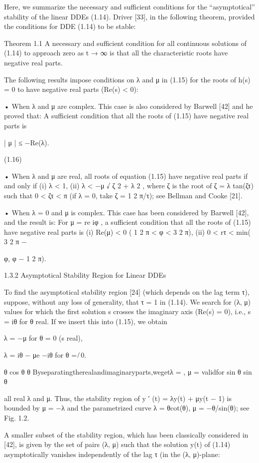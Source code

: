 \documentclass[12pt]{article}
\begin{document}
Here, we summarize the necessary and sufficient conditions for the “asymptotical” stability of the linear DDEs (1.14). Driver [33], in the 
following theorem, provided the conditions for DDE (1.14) to be stable:

Theorem 1.1 A necessary and sufficient condition for all continuous solutions of (1.14) to approach zero as t → ∞ is that all the 
characteristic roots have negative real parts.

The following results impose conditions on λ and μ in (1.15) for the roots of h(s) = 0 to have negative real parts (Re(s) < 0):

• When λ and μ are complex. This case is also considered by Barwell [42] and he proved that: A sufficient condition that all the roots of 
(1.15) have negative real parts is

| μ | ≤ −Re(λ).

(1.16)

• When λ and μ are real, all roots of equation (1.15) have negative real parts if and only if (i) λ < 1, (ii) λ < −μ √ ζ 2 + λ 2 , where ζ 
is the root of ζ = λ tan(ζτ) such that 0 < ζτ < π (if λ = 0, take ζ = 1 2 π/τ); see Bellman and Cooke [21].

• When λ = 0 and μ is complex. This case has been considered by Barwell [42], and the result is: For μ = re iφ , a sufficient condition that 
all the roots of (1.15) have negative real parts is (i) Re(μ) < 0 ( 1 2 π < φ < 3 2 π), (ii) 0 < rτ < min( 3 2 π −

φ, φ − 1 2 π).

1.3.2 Asymptotical Stability Region for Linear DDEs

To find the asymptotical stability region [24] (which depends on the lag term τ), suppose, without any loss of generality, that τ = 1 in 
(1.14). We search for (λ, μ) values for which the first solution s crosses the imaginary axis (Re(s) = 0), i.e., s = iθ for θ real. If we 
insert this into (1.15), we obtain

λ = −μ for θ = 0 (s real),

λ = iθ − μe −iθ for θ = ̸ 0.

θ cos θ θ Byseparatingtherealandimaginaryparts,wegetλ = , μ = validfor sin θ sin θ

all real λ and μ. Thus, the stability region of y ′ (t) = λy(t) + μy(t − 1) is bounded by μ = −λ and the parametrized curve λ = θcot(θ), μ 
= −θ/sin(θ); see Fig. 1.2.

A smaller subset of the stability region, which has been classically considered in [42], is given by the set of pairs (λ, μ) such that the 
solution y(t) of (1.14) asymptotically vanishes independently of the lag τ (in the (λ, μ)-plane:
\end{document}
